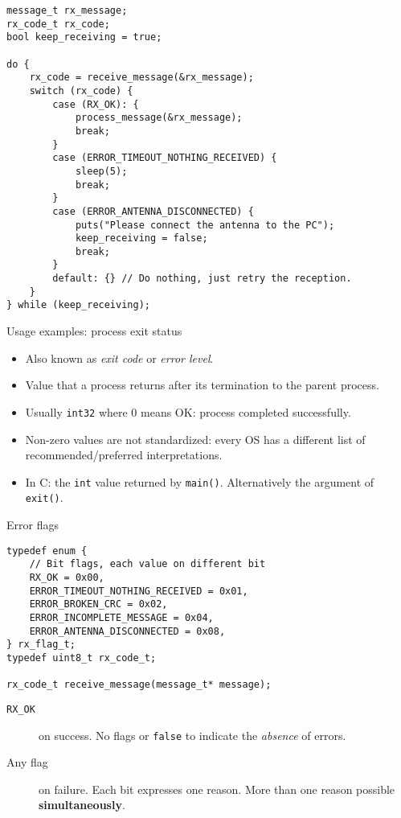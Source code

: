 \documentclass[aspectratio=169,14pt]{beamer}
\begin{document}
\begin{frame}[fragile]{}
\begin{lstlisting}[style=cstyle,basicstyle=\scriptsize\ttfamily]
message_t rx_message;
rx_code_t rx_code;
bool keep_receiving = true;

do {
    rx_code = receive_message(&rx_message);
    switch (rx_code) {
        case (RX_OK): {
            process_message(&rx_message);
            break;
        }
        case (ERROR_TIMEOUT_NOTHING_RECEIVED) {
            sleep(5);
            break;
        }
        case (ERROR_ANTENNA_DISCONNECTED) {
            puts("Please connect the antenna to the PC");
            keep_receiving = false;
            break;
        }
        default: {} // Do nothing, just retry the reception.
    }
} while (keep_receiving);
\end{lstlisting}
\end{frame}



\begin{frame}{Usage examples: process exit status}
\begin{itemize}
    \item Also known as \textit{exit code} or \textit{error level}.
    \item Value that a process returns after its termination to the parent process.
    \item Usually \texttt{int32} where 0 means OK: process completed successfully.
    \item Non-zero values are not standardized: every OS has a different list of recommended/preferred interpretations.
    \item In C: the \texttt{int} value returned by \texttt{main()}. Alternatively the argument of \texttt{exit()}.
\end{itemize}
\end{frame}



\begin{frame}[fragile]{Error flags}
\begin{lstlisting}[style=cstyle]
typedef enum {
    // Bit flags, each value on different bit
    RX_OK = 0x00,
    ERROR_TIMEOUT_NOTHING_RECEIVED = 0x01,
    ERROR_BROKEN_CRC = 0x02,
    ERROR_INCOMPLETE_MESSAGE = 0x04,
    ERROR_ANTENNA_DISCONNECTED = 0x08,
} rx_flag_t;
typedef uint8_t rx_code_t;

rx_code_t receive_message(message_t* message);
\end{lstlisting}

\begin{description}
    \item[\texttt{RX\_OK}] on success. No flags or \texttt{false} to indicate the \textit{absence} of errors.
    \item[Any flag] on failure. Each bit expresses one reason. More than one reason possible \textbf{simultaneously}.
\end{description}
\end{frame}
\end{document}
